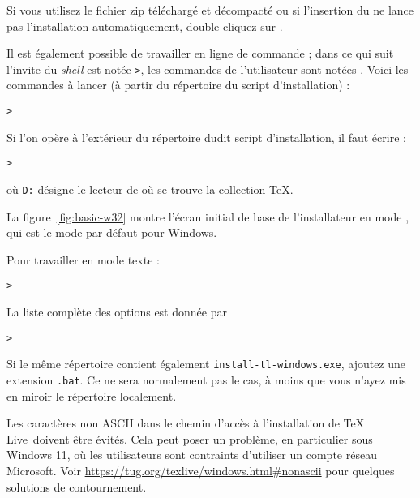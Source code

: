 \documentclass[german, english, french, 12pt]{article}
\renewcommand{\TL}{\TeX{} Live\xspace}%
\begin{document}
Si vous utilisez le fichier zip téléchargé et décompacté ou si l'insertion du
\DVD{} ne lance pas l'installation automatiquement, double-cliquez sur
.

Il est également possible de travailler en ligne de commande ; dans ce qui suit
l'invite du \textit{shell} est notée \texttt{>}, les commandes de l'utilisateur
sont notées . Voici les commandes à lancer (à partir du
répertoire du script d'installation) :
\begin{alltt}
> 
\end{alltt}
Si l'on opère à l'extérieur du répertoire dudit script d'installation, il faut
écrire :
\begin{alltt}
> 
\end{alltt}
où \texttt{D:} désigne le lecteur de \DVD où se trouve la collection \TeX.

La figure~\ref{fig:basic-w32} montre l'écran initial de base de l'installateur
en mode \GUI{}, qui est le mode par défaut pour Windows.

Pour travailler en mode texte :
\begin{alltt}
> 
\end{alltt}
La liste complète des options est donnée par
\begin{alltt}
> 
\end{alltt}

Si le même répertoire contient également \texttt{install-tl-windows.exe},
ajoutez une extension \texttt{.bat}. Ce ne sera normalement pas le cas, à moins
que vous n'ayez mis en miroir le répertoire  localement.

Les caractères non ASCII dans le chemin d'accès à l'installation de \TL\ doivent
être évités.  Cela peut poser un problème, en particulier sous Windows 11, où
les utilisateurs sont contraints d'utiliser un compte réseau Microsoft.  Voir
\url{https://tug.org/texlive/windows.html\#nonascii} pour quelques solutions de
contournement.
\end{document}

